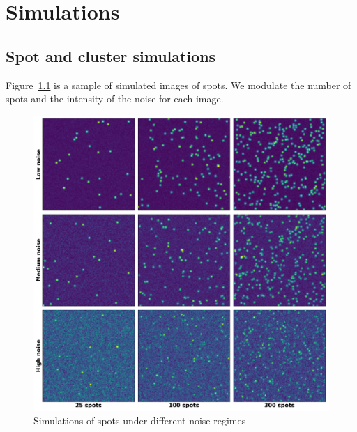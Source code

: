 
\graphicspath{{../../figures/appendix/}}

\chapter{Simulations}
\label{ch:appendix_simulation}

\newpage

\section{Spot and cluster simulations}
\label{sec:appendix_simulations_spots}

\vfill

\noindent
Figure~\ref{fig:spots_mosaic} is a sample of simulated images of spots.
We modulate the number of spots and the intensity of the noise for each image.

\vfill

\begin{figure}[h]
    \centering
    \includegraphics[width=\textwidth]{figures/appendix/spots_mosaic}
    \caption[Simulations of spots under different noise regimes]{Simulations of spots under different noise regimes}
    \label{fig:spots_mosaic}
\end{figure}

